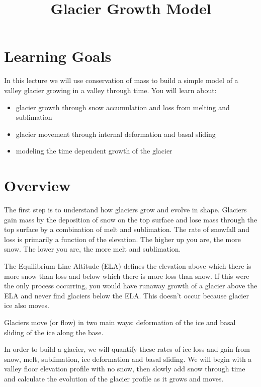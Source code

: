 \documentclass[11pt, oneside]{article}   	%
\date{}							%
\begin{document}
\title{\bf Glacier Growth Model}
\maketitle
 
\section*{Learning Goals}
In this lecture we will use conservation of mass to build a simple model of a valley glacier growing in a valley through time.   You will learn about:
\begin{itemize}
\item glacier growth through snow accumulation and loss from melting and sublimation 
\item  glacier movement through internal deformation  and basal sliding 
\item  modeling the time dependent growth of the glacier
\end{itemize}

\section*{Overview}

The first step is to understand how glaciers grow and evolve in shape. Glaciers gain mass by the deposition of snow on the top surface and lose mass through the top surface by a combination of melt and sublimation.  The rate of snowfall and loss is primarily a function of the elevation.  The higher up you are, the more snow.  The lower you are, the more melt and sublimation.  

The Equilibrium Line Altitude (ELA) defines the elevation above which there is more snow than loss and below which there is more loss than snow.  If this were the only process occurring, you would have runaway growth of a glacier above the ELA and never find glaciers below the ELA.  This doesn't occur because glacier ice also moves.  

Glaciers move (or flow) in two main ways:  deformation of the ice and basal sliding of the ice along the base.

In order to build a glacier, we will quantify these rates of ice loss and gain from snow, melt, sublimation, ice deformation and basal sliding.  We will begin with a valley floor elevation profile with no snow, then slowly add snow through time and calculate the evolution of the glacier profile as it grows and moves.
\end{document}
